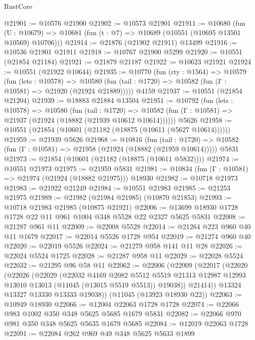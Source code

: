 \begin{lexlean}{RustCore}
\begin{coremodule}
@21901 := @10576 @21900
@21902 := @10573 @21901
@21911 := @10680
    (fun (U : @10679) => @10681 (fun (t : @7) => @10689 (@10551 (@10695 @13501 @10569) @10706)))
@21914 := @21876 (@21902 @21911) @13499
@21916 := @10536 @21901 @21911
@21918 := @10767 @21900 @5299
@21920 := @10551 (@21854 @21184)
@21921 := @21879 @21187
@21922 := @10623 @21921
@21924 := @10551 (@21922 @10644)
@21935 := @10770
    (fun (rty : @1564) =>
    @10579
      (fun (lets : @10578) =>
      @10580 (fun (tail : @1720) => @10582 (fun (Γ : @10581) => @21920 (@21924 @21889)))))
    @4159
@21937 := @10551 (@21854 @21204)
@21939 := @18883 @21884 @13504
@21951 := @10792
    (fun (lets : @10578) =>
    @10580
      (fun (tail : @1720) =>
      @10582 (fun (Γ : @10581) => @21937 (@21924 (@18882 (@21939 @10612 @10614))))))
    @5626
@21958 := @10551 (@21854 (@10601 (@21182 (@18875 (@10611 (@5627 @10614))))))
@21959 := @21939 @5626
@21968 := @10816
    (fun (tail : @1720) => @10582 (fun (Γ : @10581) => @21958 (@21924 (@18882 (@21959 @10614)))))
    @5831
@21973 := @21854 (@10601 (@21182 (@18875 (@10611 @5832))))
@21974 := @10551 @21973
@21975 := @21959 @5831
@21981 := @10834 (fun (Γ : @10581) => @21974 (@21924 (@18882 @21975))) @18930
@21982 := @10718 @21973
@21983 := @21922 @21249
@21984 := @10551 @21983
@21985 := @21253 @21975
@21989 := @21982 (@21984 @21985) (@10870 @21853)
@21993 := @10718 @21983 @21985 (@10875 @21921)
@22006 := @13699 @18930 @1728 @1728 @22 @11 @961 @1004 @348 @5528 @22 @2327 @5625 @5831
@22008 := @21287 @961 @11
@22009 := @22008 @5528
@22014 := @21264 @223 @960 @40 @11 @1679
@22017 := @22014 @5526 @1728 @954
@22019 := @21274 @960 @40
@22020 := @22019 @5526
@22024 := @21279 @958 @141 @11 @28
@22026 := @22024 @5524 @1725
@22028 := @21287 @958 @11
@22029 := @22028 @5524
@22032 := @21295 @96 @58 @11
@22062 := @22006
    (@22009
      (@22017
        (@22020
          (@22026
            (@22029
              (@22032
                @4169
                @2082
                @5512
                @5519
                @21313
                @12987
                @12993
                @13010
                @13013
                (@11045 (@13015 @5519 @5513))
                @19038))
            @21414))
        @13324
        @13327
        @13330
        @13333
        @19038))
    (@11045 (@13923 @18930 @22))
@22063 := @10949 @18930
@22066 := @12004 @22063 @1728 @1728
@22074 := @22066 @983 @1002 @350 @348 @5625 @5685 @1679 @5831
@22082 := @22066 @970 @981 @350 @348 @5625 @5635 @1679 @5685
@22084 := @12019 @22063 @1728
@22091 := @22084 @262 @969 @49 @348 @5625 @5633 @1899

\end{coremodule}
\end{lexlean}
